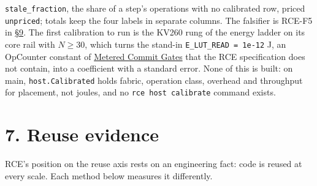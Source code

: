 \documentclass[10pt,letterpaper]{article}
\begin{document}
\texttt{stale\_fraction}, the share of a step's operations with no
calibrated row, priced \texttt{unpriced}; totals keep the four labels in
separate columns. The falsifier is RCE-F5 in
\href{https://research.openie.dev/papers/rce/\#9-falsifiers}{§9}. The
first calibration to run is the KV260 rung of the energy ladder on its
core rail with \(N \ge 30\), which turns the stand-in
\texttt{E\_\allowbreak{}LUT\_\allowbreak{}READ\ =\ 1e-\allowbreak{}12} J, an OpCounter constant of
\href{https://research.openie.dev/papers/gates/}{Metered Commit Gates}
that the RCE specification does not contain, into a coefficient with a
standard error. None of this is built: on main, \texttt{host.Calibrated}
holds fabric, operation class, overhead and throughput for placement,
not joules, and no \texttt{rce\ host\ calibrate} command exists.

\section{7. Reuse evidence}\label{reuse-evidence}

RCE's position on the reuse axis rests on an engineering fact: code is
reused at every scale. Each method below measures it differently.
\end{document}
